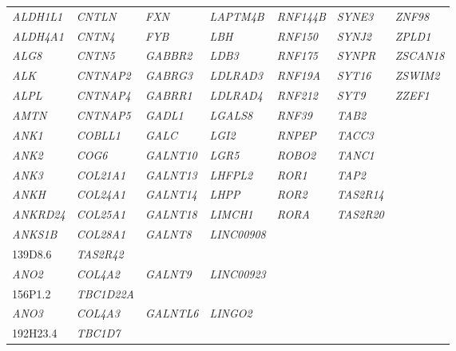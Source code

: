 \begin{refsection}
\begin{otherlanguage}{english}
\begin{scriptsize}
\begin{longtable}{lllllll}
\textit{ALDH1L1} & \textit{CNTLN} & \textit{FXN} & \textit{LAPTM4B} & \textit{RNF144B} & \textit{SYNE3} & \textit{ZNF98} \\
\textit{ALDH4A1} & \textit{CNTN4} & \textit{FYB} & \textit{LBH} & \textit{RNF150} & \textit{SYNJ2} & \textit{ZPLD1} \\
\textit{ALG8} & \textit{CNTN5} & \textit{GABBR2} & \textit{LDB3} & \textit{RNF175} & \textit{SYNPR} & \textit{ZSCAN18} \\
\textit{ALK} & \textit{CNTNAP2} & \textit{GABRG3} & \textit{LDLRAD3} & \textit{RNF19A} & \textit{SYT16} & \textit{ZSWIM2} \\
\textit{ALPL} & \textit{CNTNAP4} & \textit{GABRR1} & \textit{LDLRAD4} & \textit{RNF212} & \textit{SYT9} & \textit{ZZEF1} \\
\textit{AMTN} & \textit{CNTNAP5} & \textit{GADL1} & \textit{LGALS8} & \textit{RNF39} & \textit{TAB2} & \textit{} \\
\textit{ANK1} & \textit{COBLL1} & \textit{GALC} & \textit{LGI2} & \textit{RNPEP} & \textit{TACC3} & \textit{} \\
\textit{ANK2} & \textit{COG6} & \textit{GALNT10} & \textit{LGR5} & \textit{ROBO2} & \textit{TANC1} & \textit{} \\
\textit{ANK3} & \textit{COL21A1} & \textit{GALNT13} & \textit{LHFPL2} & \textit{ROR1} & \textit{TAP2} & \textit{} \\
\textit{ANKH} & \textit{COL24A1} & \textit{GALNT14} & \textit{LHPP} & \textit{ROR2} & \textit{TAS2R14} & \textit{} \\
\textit{ANKRD24} & \textit{COL25A1} & \textit{GALNT18} & \textit{LIMCH1} & \textit{RORA} & \textit{TAS2R20} & \textit{} \\
\textit{ANKS1B} & \textit{COL28A1} & \textit{GALNT8} & \textit{LINC00908} & \textit{\begin{tabular}[c]{@{}l@{}}RP1-\\ 139D8.6\end{tabular}} & \textit{TAS2R42} & \textit{} \\
\textit{ANO2} & \textit{COL4A2} & \textit{GALNT9} & \textit{LINC00923} & \textit{\begin{tabular}[c]{@{}l@{}}RP11-\\ 156P1.2\end{tabular}} & \textit{TBC1D22A} & \textit{} \\
\textit{ANO3} & \textit{COL4A3} & \textit{GALNTL6} & \textit{LINGO2} & \textit{\begin{tabular}[c]{@{}l@{}}RP11-\\ 192H23.4\end{tabular}} & \textit{TBC1D7} & \textit{} \\

\end{longtable}
\end{scriptsize}
\end{otherlanguage}
\end{refsection}
